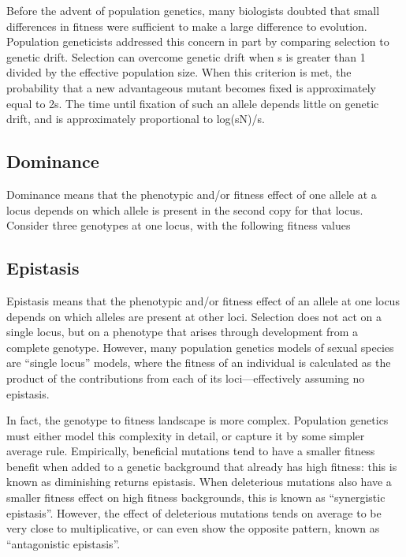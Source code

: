 Before the advent of population genetics, many biologists doubted that small differences in fitness were sufficient to make a large difference to evolution. Population geneticists addressed this concern in part by comparing selection to genetic drift. Selection can overcome genetic drift when s is greater than 1 divided by the effective population size. When this criterion is met, the probability that a new advantageous mutant becomes fixed is approximately equal to 2s. The time until fixation of such an allele depends little on genetic drift, and is approximately proportional to log(sN)/s.

\hypertarget{dominance}{%
\subsection{Dominance}\label{dominance}}

Dominance means that the phenotypic and/or fitness effect of one allele at a locus depends on which allele is present in the second copy for that locus. Consider three genotypes at one locus, with the following fitness values

\hypertarget{epistasis}{%
\subsection{Epistasis}\label{epistasis}}

Epistasis means that the phenotypic and/or fitness effect of an allele at one locus depends on which alleles are present at other loci. Selection does not act on a single locus, but on a phenotype that arises through development from a complete genotype. However, many population genetics models of sexual species are ``single locus'' models, where the fitness of an individual is calculated as the product of the contributions from each of its loci---effectively assuming no epistasis.

In fact, the genotype to fitness landscape is more complex. Population genetics must either model this complexity in detail, or capture it by some simpler average rule. Empirically, beneficial mutations tend to have a smaller fitness benefit when added to a genetic background that already has high fitness: this is known as diminishing returns epistasis. When deleterious mutations also have a smaller fitness effect on high fitness backgrounds, this is known as ``synergistic epistasis''. However, the effect of deleterious mutations tends on average to be very close to multiplicative, or can even show the opposite pattern, known as ``antagonistic epistasis''.

